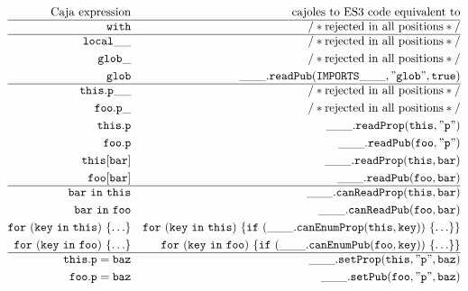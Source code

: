\documentclass[letterpaper,twocolumn,10pt]{article}
\newcommand{\code}[1]{{\tt {#1}}}              %
\begin{document}
\begin{figure}
\begin{eqnarray}
  \mathrm{Caja\ expression} & \nonumber                 & \mathrm{cajoles\ to\ ES3\ code\ equivalent\ to} \\
  \hline
  \code{with}               & \label{with:bad}          & \mathrm{/*rejected\ in\ all\ positions*/} \\
  \hline
  \code{local\_\_}          & \label{var:bad-suffix}    & \mathrm{/*rejected\ in\ all\ positions*/} \\
  \code{glob\_}             & \label{var:bad-global-suffix} & \mathrm{/*rejected\ in\ all\ positions*/} \\
  \code{glob}               & \label{var:global}        & \code{\_\_\_.readPub(IMPORTS\_\_\_,"glob",true)} \\
  \hline
  \code{this.p\_\_}         & \label{read:bad-suffix}   & \mathrm{/*rejected\ in\ all\ positions*/} \\
  \code{foo.p\_}            & \label{read:bad-internal} & \mathrm{/*rejected\ in\ all\ positions*/} \\
  \code{this.p}             & \label{read:internal}     & \code{\_\_\_.readProp(this,"p")} \\
  \code{foo.p}              & \label{read:public}       & \code{\_\_\_.readPub(foo,"p")} \\
  \code{this[bar]}          & \label{read:index-internal} & \code{\_\_\_.readProp(this,bar)} \\
  \code{foo[bar]}           & \label{read:index-public} & \code{\_\_\_.readPub(foo,bar)} \\
  \hline
  \code{bar\ in\ this}      & \label{in:internal}       & \code{\_\_\_.canReadProp(this,bar)} \\
  \code{bar\ in\ foo}       & \label{in:public}         & \code{\_\_\_.canReadPub(foo,bar)} \\
  \code{for\ (key\ in\ this)\ \{\ldots\}} & \label{for:internal}
                                 & \code{for\ (key\ in\ this)\ \{if\ (\_\_\_.canEnumProp(this,key))\ \{\ldots\}\}}\\
  \code{for\ (key\ in\ foo)\ \{\ldots\}}  & \label{for:public}
                                 & \code{for\ (key\ in\ foo)\ \{if\ (\_\_\_.canEnumPub(foo,key))\ \{\ldots\}\}} \\
  \hline
  \code{this.p = baz}       & \label{set:internal}      & \code{\_\_\_.setProp(this,"p",baz)} \\
  \code{foo.p = baz}        & \label{set:public}        & \code{\_\_\_.setPub(foo,"p",baz)} \\

\end{eqnarray}
\end{figure}
\end{document}
